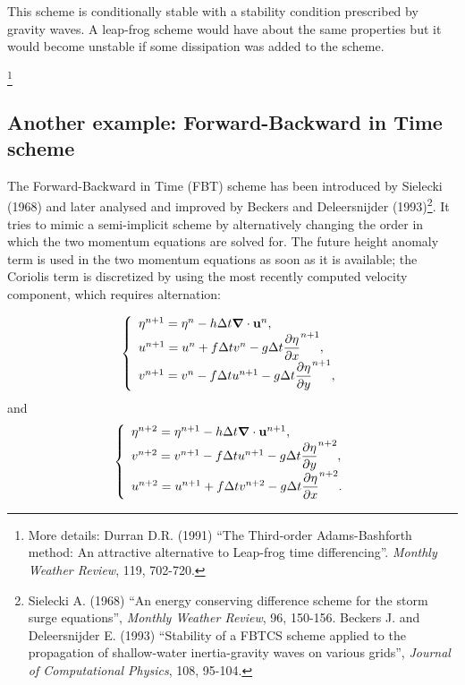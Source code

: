 	This scheme is conditionally stable with a stability condition prescribed by gravity waves. A leap-frog scheme would have about the same properties but it would become unstable if some dissipation was added to the scheme. \\
	

\medskip

\footnote{More details: Durran D.R. (1991) ``The Third-order Adams-Bashforth method: An attractive alternative to Leap-frog time differencing''. \emph{Monthly Weather Review}, 119, 702-720.}


\subsection{Another example: Forward-Backward in Time scheme}

The Forward-Backward in Time (FBT) scheme has been introduced by Sielecki (1968) and later analysed and improved by Beckers and Deleersnijder (1993)\footnote{Sielecki A. (1968) ``An energy conserving difference scheme for the storm surge equations'', \emph{Monthly Weather Review}, 96, 150-156. Beckers J. and Deleersnijder E. (1993) ``Stability of a FBTCS scheme applied to the propagation of shallow-water inertia-gravity waves on various grids'', \emph{Journal of Computational Physics}, 108, 95-104.}. It tries to mimic a semi-implicit scheme by alternatively changing the order in which the two momentum equations are solved for. The future height anomaly term is used in the two momentum equations as soon as it is available; the Coriolis term is discretized by using the most recently computed velocity component, which requires alternation:

\[
\left\{ \begin{array}{l}
	\eta^{n+1} = \eta^n - h \Delta t \mbox{\boldmath $\nabla$} \cdot \mathbf{u}^n,
	\\
	u^{n+1} = u^n + f \Delta t v^n - g \Delta t \displaystyle \frac{\partial \eta}{\partial x}^{n+1},
	\\
	v^{n+1} = v^n - f \Delta t u^{n+1} - g \Delta t \displaystyle \frac{\partial \eta}{\partial y}^{n+1},
\end{array} \right.
\]
and
\[
\left\{ \begin{array}{l}
	\eta^{n+2} = \eta^{n+1} - h \Delta t \mbox{\boldmath $\nabla$} \cdot \mathbf{u}^{n+1},
	\\
	v^{n+2} = v^{n+1} - f \Delta t u^{n+1} - g \Delta t \displaystyle \frac{\partial \eta}{\partial y}^{n+2},
	\\
	u^{n+2} = u^{n+1} + f \Delta t v^{n+2} - g \Delta t \displaystyle \frac{\partial \eta}{\partial x}^{n+2}.
\end{array} \right.
\]


